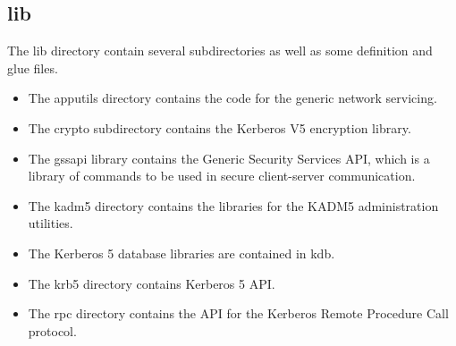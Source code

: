 \documentclass[letterpaper,10pt,english]{sphinxmanual}
\begin{document}
\subsection{lib}
\label{\detokenize{build/directory_org:lib}}\label{\detokenize{build/directory_org:id1}}
The lib directory contain several subdirectories as well as some
definition and glue files.
\begin{itemize}
\item {} 
The apputils directory contains the code for the generic network
servicing.

\item {} 
The crypto subdirectory contains the Kerberos V5 encryption
library.

\item {} 
The gssapi library contains the Generic Security Services API,
which is a library of commands to be used in secure client-server
communication.

\item {} 
The kadm5 directory contains the libraries for the KADM5
administration utilities.

\item {} 
The Kerberos 5 database libraries are contained in kdb.

\item {} 
The krb5 directory contains Kerberos 5 API.

\item {} 
The rpc directory contains the API for the Kerberos Remote
Procedure Call protocol.

\end{itemize}
\end{document}
